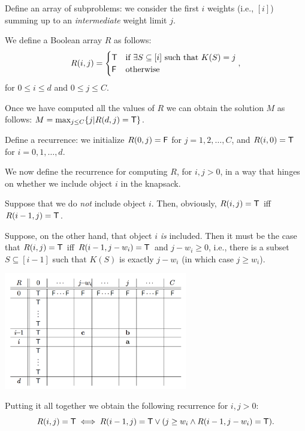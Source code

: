 \begin{frame}
Define an array of subproblems: we consider the first $i$ weights
(i.e., $[i]$) summing up to an {\em intermediate} weight limit $j$.

We define a Boolean array $R$ as follows:
$$
R(i,j)=\begin{cases}
\mathsf{T} & \mbox{if $\exists S\subseteq [i]$ such that $K(S) = j$} \\
\mathsf{F} & \mbox{otherwise}
\end{cases},
$$
for $0\leq i\leq d$ and $0\leq j\leq C$.

Once we have computed all the values of $R$ we can obtain the solution $M$ as
follows: $M=\max_{j\leq C}\{j|R(d,j)=\mathsf{T}\}$.
\end{frame}

\begin{frame}
Define a recurrence: we initialize $R(0,j)=\mathsf{F}$ for $j=1,2,\ldots,C$, and
$R(i,0)=\mathsf{T}$ for $i=0,1,\ldots,d$.

We now define the recurrence for computing $R$, for $i,j>0$, in a way
that hinges on whether we include object $i$ in the knapsack.

Suppose that we do {\em not} include
object $i$. Then, obviously, $R(i,j)=\mathsf{T}$ iff $R(i-1,j)=\mathsf{T}$.
\end{frame}

\begin{frame}
Suppose, on the other hand, that object $i$ {\em is} included.  Then it must
be the case that $R(i,j)=\mathsf{T}$ iff $R(i-1,j-w_i)=\mathsf{T}$ and
$j-w_i\geq 0$, i.e., there is a subset $S\subseteq[i-1]$
such that $K(S)$ is exactly
$j-w_i$ (in which case $j\geq w_i$).

\begin{center}
\includegraphics[width=8cm]{Figures/knp-table.png}
\end{center}
\end{frame}

\begin{frame}
Putting it all together we obtain
the following recurrence for $i,j>0$:
$$
R(i,j)=\mathsf{T}
\iff
R(i-1,j)=\mathsf{T}\vee(j\geq w_i\wedge R(i-1,j-w_i)=\mathsf{T}).
$$
\end{frame}

